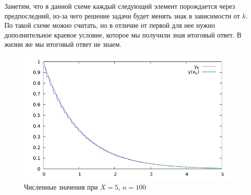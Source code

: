 \begin{remark}
\begin{example}
\begin{enumerate}
            Заметим, что в данной схеме каждый следующий элемент порождается через предпоследний,
            из-за чего решение задачи будет менять знак в зависимости от $k$.
            По такой схеме можно считать, но в отличие от первой для нее нужно
            дополнительное краевое условие, которое мы получили зная итоговый ответ.
            В жизни же мы итоговый ответ не знаем.
            \begin{figure}[h]
              \centering
              \includegraphics[scale=0.75]{12/3Scheme.pdf}
              \caption{Численные значения при $X=5$, $n=100$}
            \end{figure}
    \end{enumerate}
  \end{example}
\end{remark}
